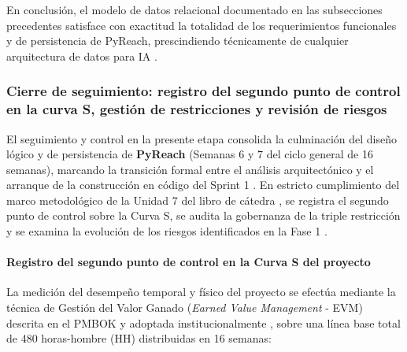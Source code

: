 En conclusión, el modelo de datos relacional documentado en las subsecciones precedentes satisface con exactitud la totalidad de los requerimientos funcionales y de persistencia de PyReach, prescindiendo técnicamente de cualquier arquitectura de datos para IA \cite{martin2017cleanarch, torres2026proyecto}.

\subsubsection{Cierre de seguimiento: registro del segundo punto de control en la curva S, gestión de restricciones y revisión de riesgos}

El seguimiento y control en la presente etapa consolida la culminación del diseño lógico y de persistencia de \textbf{PyReach} (Semanas 6 y 7 del ciclo general de 16 semanas), marcando la transición formal entre el análisis arquitectónico y el arranque de la construcción en código del Sprint 1 \cite{pmi2021pmbok, torres2026proyecto}. En estricto cumplimiento del marco metodológico de la Unidad 7 del libro de cátedra \cite{torres2026proyecto}, se registra el segundo punto de control sobre la Curva S, se audita la gobernanza de la triple restricción y se examina la evolución de los riesgos identificados en la Fase 1 \cite{pressman2020software}.

\paragraph*{Registro del segundo punto de control en la Curva S del proyecto}
La medición del desempeño temporal y físico del proyecto se efectúa mediante la técnica de Gestión del Valor Ganado (\textit{Earned Value Management} - EVM) descrita en el PMBOK \cite{pmi2021pmbok} y adoptada institucionalmente \cite{torres2026proyecto}, sobre una línea base total de 480 horas-hombre (HH) distribuidas en 16 semanas:

